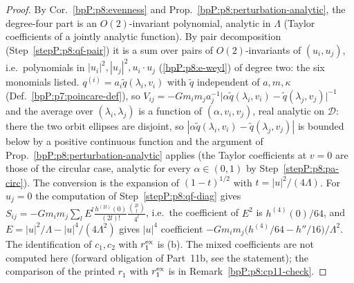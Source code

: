 \begin{proof}
\label{stepP:p8:q4-str} By Cor.~\ref{bpP:p8:evenness} and Prop.~\ref{bpP:p8:perturbation-analytic}, the degree-four part is an $O(2)$-invariant polynomial, analytic in $\Lambda$ (Taylor coefficients of a jointly analytic function). By pair decomposition (Step~\ref{stepP:p8:qf-pair}) it is a sum over pairs of $O(2)$-invariants of $(u_i,u_j)$, i.e.\ polynomials in $|u_i|^2,|u_j|^2,u_i\cdot u_j$ (\ref{bpP:p8:e-weyl}) of degree two: the six monomials listed.
\label{stepP:p8:q4-a} $q^{(i)}=a_i\tilde q(\lambda_i,v_i)$ with $\tilde q$ independent of $a,m,\kappa$ (Def.~\ref{bpP:p7:poincare-def}), so $V_{ij}=-Gm_im_ja_j^{-1}\big|\alpha\tilde q(\lambda_i,v_i)-\tilde q(\lambda_j,v_j)\big|^{-1}$ and the average over $(\lambda_i,\lambda_j)$ is a function of $(\alpha,v_i,v_j)$, real analytic on $\mathcal D$: there the two orbit ellipses are disjoint, so $|\alpha\tilde q(\lambda_i,v_i)-\tilde q(\lambda_j,v_j)|$ is bounded below by a positive continuous function and the argument of Prop.~\ref{bpP:p8:perturbation-analytic} applies (the Taylor coefficients at $v=0$ are those of the circular case, analytic for every $\alpha\in(0,1)$ by Step~\ref{stepP:p8:pa-circ}). The conversion is the expansion of $(1-t)^{1/2}$ with $t=|u|^2/(4\Lambda)$.
\label{stepP:p8:q4-b} For $u_j=0$ the computation of Step~\ref{stepP:p8:qf-diag} gives $S_{ij}=-Gm_im_j\sum_{l}E^{l}\frac{h^{(2l)}(0)}{(2l)!}\frac{\binom{2l}l}{4^l}$, i.e.\ the coefficient of $E^2$ is $h^{(4)}(0)/64$, and $E=|u|^2/\Lambda-|u|^4/(4\Lambda^2)$ gives $|u|^4$ coefficient $-Gm_im_j\big(h^{(4)}/64-h''/16\big)/\Lambda^2$.
\label{stepP:p8:q4-c} The identification of $c_1,c_2$ with $r_1^{\rm ex}$ is (b). The mixed coefficients are not computed here (forward obligation of Part~11b, see the statement); the comparison of the printed $r_1$ with $r_1^{\rm ex}$ is in Remark~\ref{bpP:p8:cp11-check}.
\end{proof}


